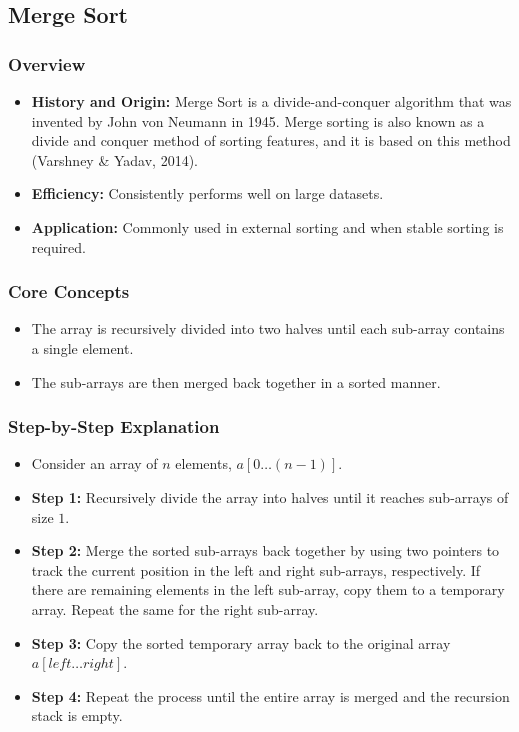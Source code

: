 \subsection[Merge Sort]{Merge Sort \cite{balogun2023halstead}}
    \subsubsection{Overview}
        \begin{itemize}
            \item \textbf{History and Origin:} Merge Sort is a divide-and-conquer algorithm that was invented by John von Neumann in 1945.
            Merge sorting is also known as a divide and conquer method of sorting features, and it is based on this method (Varshney \& Yadav, 2014).
            \item \textbf{Efficiency:} Consistently performs well on large datasets.
            \item \textbf{Application:} Commonly used in external sorting and when stable sorting is required.
        \end{itemize}
    \subsubsection{Core Concepts}
        \begin{itemize}
            \item The array is recursively divided into two halves until each sub-array contains a single element.
            \item The sub-arrays are then merged back together in a sorted manner.
        \end{itemize}
    \subsubsection{Step-by-Step Explanation}
        \begin{itemize}
            \item Consider an array of $n$ elements, $a[0\ldots (n - 1)]$.
            \item \textbf{Step 1:} Recursively divide the array into halves until it reaches sub-arrays of size $1$.
            \item \textbf{Step 2:} Merge the sorted sub-arrays back together by using two pointers to track the current position in the left and right sub-arrays, respectively.
            If there are remaining elements in the left sub-array, copy them to a temporary array. Repeat the same for the right sub-array.
            \item \textbf{Step 3:} Copy the sorted temporary array back to the original array $a[left\ldots right]$.
            \item \textbf{Step 4:} Repeat the process until the entire array is merged and the recursion stack is empty.
        \end{itemize}
